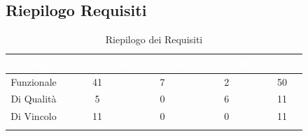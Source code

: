 \subsection{Riepilogo Requisiti}\label{Riepilogo}
\begin{center}
\begin{longtable}[c]{|c|c|c|c|c|}
\hline
\rowcolor{bluelogo}\textbf{\textcolor{white}{Tipologia}} & \textbf{\textcolor{white}{Obbligatorio}} & \textbf{\textcolor{white}{Opzionale}} & \textbf{\textcolor{white}{Desiderabile}} & \textbf{\textcolor{white}{Totale}}\\
\hline \hline
\endhead
Funzionale & 41 & 7 & 2 & 50\\
\hline
\rowcolor{grigio}Di Qualità & 5 & 0 & 6 & 11\\
\hline
Di Vincolo & 11 & 0 & 0 & 11\\
\hline
\caption{Riepilogo dei Requisiti}
\end{longtable}
\end{center}